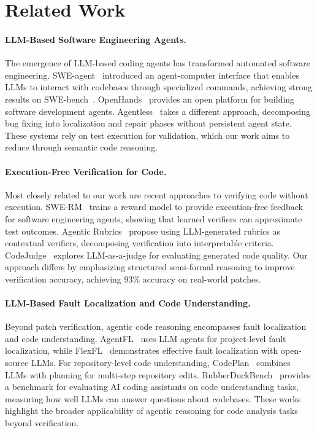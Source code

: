 \documentclass[]{meta}
\begin{document}
\section{Related Work}

\paragraph{LLM-Based Software Engineering Agents.}
The emergence of LLM-based coding agents has transformed automated software engineering.
SWE-agent~\cite{yang2024sweagent} introduced an agent-computer interface that enables LLMs to interact with codebases through specialized commands, achieving strong results on SWE-bench~\cite{jimenez2024swebench}.
OpenHands~\cite{wang2024openhands} provides an open platform for building software development agents.
Agentless~\cite{xia2024agentless} takes a different approach, decomposing bug fixing into localization and repair phases without persistent agent state.
These systems rely on test execution for validation, which our work aims to reduce through semantic code reasoning.

\paragraph{Execution-Free Verification for Code.}
Most closely related to our work are recent approaches to verifying code without execution.
SWE-RM~\cite{shum2025swerm} trains a reward model to provide execution-free feedback for software engineering agents, showing that learned verifiers can approximate test outcomes.
Agentic Rubrics~\cite{raghavendra2025rubrics} propose using LLM-generated rubrics as contextual verifiers, decomposing verification into interpretable criteria.
CodeJudge~\cite{tong2024codejudge} explores LLM-as-a-judge for evaluating generated code quality.
Our approach differs by emphasizing structured semi-formal reasoning to improve verification accuracy, achieving 93\% accuracy on real-world patches.

\paragraph{LLM-Based Fault Localization and Code Understanding.}
Beyond patch verification, agentic code reasoning encompasses fault localization and code understanding.
AgentFL~\cite{qin2024agentfl} uses LLM agents for project-level fault localization, while FlexFL~\cite{xu2025flexflflexibleeffectivefault} demonstrates effective fault localization with open-source LLMs.
For repository-level code understanding, CodePlan~\cite{bairi2024codeplan} combines LLMs with planning for multi-step repository edits.
RubberDuckBench~\cite{rubberduckbench} provides a benchmark for evaluating AI coding assistants on code understanding tasks, measuring how well LLMs can answer questions about codebases.
These works highlight the broader applicability of agentic reasoning for code analysis tasks beyond verification.
\end{document}
